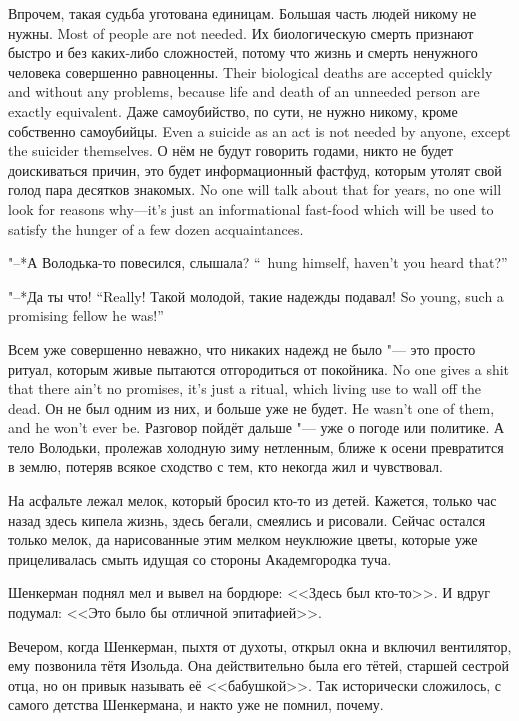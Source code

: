 Впрочем, такая судьба уготована единицам.
{Большая часть людей никому не нужны.}
{Most of people are not needed.}
{Их биологическую смерть признают быстро и без каких-либо сложностей, потому что жизнь и смерть ненужного человека совершенно равноценны.}
{Their biological deaths are accepted quickly and without any problems, because life and death of an unneeded person are exactly equivalent.}
{Даже самоубийство, по сути, не нужно никому, кроме собственно самоубийцы.}
{Even a suicide as an act is not needed by anyone, except the suicider themselves.}
{О нём не будут говорить годами, никто не будет доискиваться причин, это будет информационный фастфуд, которым утолят свой голод пара десятков знакомых.}
{No one will talk about that for years, no one will look for reasons why---it's just an informational fast-food which will be used to satisfy the hunger of a few dozen acquaintances.}

{"--*А Володька-то повесился, слышала?}
{``\Volodka\ hung himself, haven't you heard that?''}

{"--*Да ты что!}
{``Really!}
{Такой молодой, такие надежды подавал!}
{So young, such a promising fellow he was!''}

{Всем уже совершенно неважно, что никаких надежд не было "--- это просто ритуал, которым живые пытаются отгородиться от покойника.}
{No one gives a shit that there ain't no promises, it's just a ritual, which living use to wall off the dead.}
{Он не был одним из них, и больше уже не будет.}
{He wasn't one of them, and he won't ever be.}
Разговор пойдёт дальше "--- уже о погоде или политике.
А тело Володьки, пролежав холодную зиму нетленным, ближе к осени превратится в землю, потеряв всякое сходство с тем, кто некогда жил и чувствовал.

На асфальте лежал мелок, который бросил кто-то из детей.
Кажется, только час назад здесь кипела жизнь, здесь бегали, смеялись и рисовали.
Сейчас остался только мелок, да нарисованные этим мелком неуклюжие цветы, которые уже прицеливалась смыть идущая со стороны Академгородка туча.

Шенкерман поднял мел и вывел на бордюре: <<Здесь был кто-то>>.
И вдруг подумал: <<Это было бы отличной эпитафией>>.

\asterism

\label{Thu_2012_07_19}

Вечером, когда Шенкерман, пыхтя от духоты, открыл окна и включил вентилятор, ему позвонила тётя Изольда.
Она действительно была его тётей, старшей сестрой отца, но он привык называть её <<бабушкой>>.
Так исторически сложилось, с самого детства Шенкермана, и накто уже не помнил, почему.

